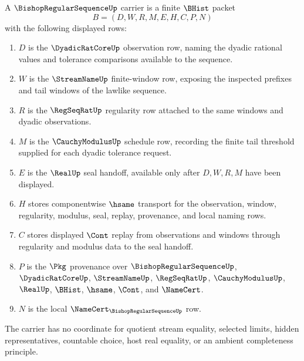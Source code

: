 \begin{definition}
\label{def:bishop-regular-sequence-carrier}
A $\BishopRegularSequenceUp$ carrier is a finite $\BHist$ packet
$$
B=(D,W,R,M,E,H,C,P,N)
$$
with the following displayed rows:
\begin{enumerate}
\item $D$ is the $\DyadicRatCoreUp$ observation row, naming the dyadic rational values and tolerance comparisons available to the sequence.
\item $W$ is the $\StreamNameUp$ finite-window row, exposing the inspected prefixes and tail windows of the lawlike sequence.
\item $R$ is the $\RegSeqRatUp$ regularity row attached to the same windows and dyadic observations.
\item $M$ is the $\CauchyModulusUp$ schedule row, recording the finite tail threshold supplied for each dyadic tolerance request.
\item $E$ is the $\RealUp$ seal handoff, available only after $D,W,R,M$ have been displayed.
\item $H$ stores componentwise $\hsame$ transport for the observation, window, regularity, modulus, seal, replay, provenance, and local naming rows.
\item $C$ stores displayed $\Cont$ replay from observations and windows through regularity and modulus data to the seal handoff.
\item $P$ is the $\Pkg$ provenance over $\BishopRegularSequenceUp$, $\DyadicRatCoreUp$, $\StreamNameUp$, $\RegSeqRatUp$, $\CauchyModulusUp$, $\RealUp$, $\BHist$, $\hsame$, $\Cont$, and $\NameCert$.
\item $N$ is the local $\NameCert_{\BishopRegularSequenceUp}$ row.
\end{enumerate}
The carrier has no coordinate for quotient stream equality, selected limits, hidden representatives, countable choice, host real equality, or an ambient completeness principle.
\end{definition}

